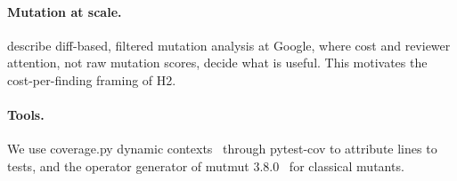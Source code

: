 \paragraph{Mutation at scale.} \citet{petrovic2018google} describe diff-based, filtered mutation analysis at Google, where cost and reviewer attention, not raw mutation scores, decide what is useful. This motivates the cost-per-finding framing of H2.

\paragraph{Tools.} We use coverage.py dynamic contexts~\cite{coveragepy} through pytest-cov to attribute lines to tests, and the operator generator of mutmut 3.8.0~\cite{mutmut} for classical mutants.
